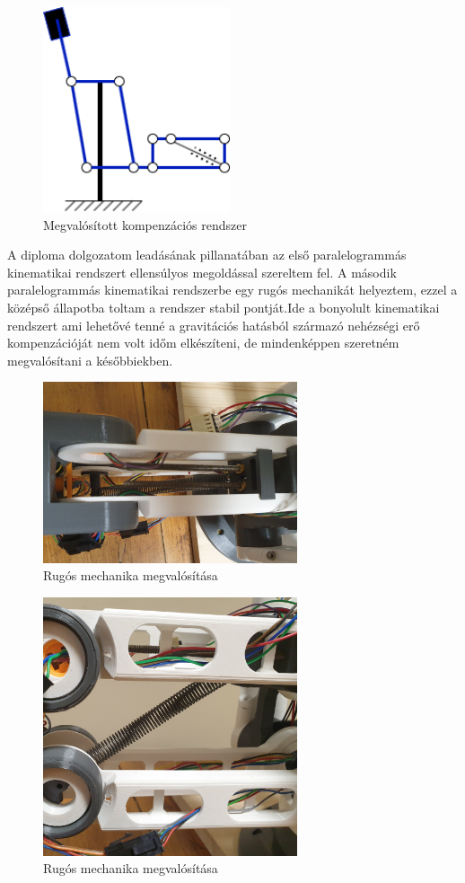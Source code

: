 \begin{figure}[!ht]
\centering
\includegraphics[width=55mm, keepaspectratio]{figures/Diagrammok/Megvalositott_kompenzacio}
\caption{Megvalósított kompenzációs rendszer}
\label{fig:Megvalositott_kompenzacio}
\end{figure}


A diploma dolgozatom leadásának pillanatában az első paralelogrammás kinematikai rendszert ellensúlyos megoldással szereltem fel. A második paralelogrammás kinematikai rendszerbe egy rugós mechanikát helyeztem, ezzel a középső állapotba toltam a rendszer stabil pontját.Ide a bonyolult kinematikai rendszert ami lehetővé tenné a gravitációs hatásból származó nehézségi erő kompenzációját nem volt időm elkészíteni, de mindenképpen szeretném megvalósítani a későbbiekben.

\begin{figure}[!ht]
\centering
\includegraphics[width=75mm, keepaspectratio]{figures/Szumma/Orso_1}
\caption{Rugós mechanika megvalósítása}
\label{fig:rugo_1}
\end{figure}

\begin{figure}[!ht]
\centering
\includegraphics[width=75mm, keepaspectratio]{figures/Szumma/Orso_2}
\caption{Rugós mechanika megvalósítása}
\label{fig:rugo_2}
\end{figure}
